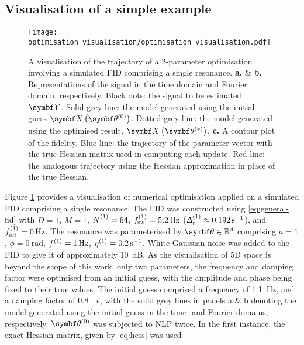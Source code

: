 \subsection{Visualisation of a simple example}
\label{subsec:optim-vis}
\begin{figure}
    \centering
    \texttt{[image: optimisation\_visualisation/optimisation\_visualisation.pdf]}
    \caption[
        A visualisation of the trajectory of a 2-parameter optimisation
        involving a simulated \acs{FID} comprising a single resonance.
    ]
    {
        A visualisation of the trajectory of a 2-parameter optimisation
        involving a simulated \acs{FID} comprising a single resonance.
        \textbf{a.} \& \textbf{b.} Representations of the signal in
        the time domain and Fourier domain, respectively.
        Black dots: the signal to be estimated $\bY$.
        Solid grey line: the model generated
        using the initial guess $\bX \left( \bthzero \right)$.
        Dotted grey line: the model generated using the optimised result, $\bX
        \left( \bthstar \right)$.
        \textbf{c.} A contour plot of the fidelity.
        Blue line: the trajectory of the parameter vector with the true
        Hessian matrix used in computing each update.
        Red line: the analogous trajectory using the Hessian approximation
        in place of the true Hessian.
    }
    \label{fig:optim-vis}
\end{figure}
Figure \ref{fig:optim-vis} provides a visualisation of numerical optimisation
applied on a simulated \ac{FID} comprising a single resonance.
The FID was constructed using \eqref{eq:general-fid} with $D=1$, $M=1$,
$\None = 64$, $f_{\mathrm{sw}}^{(1)} = \qty{5.2}{\hertz}$ ($\Updelta_t^{(1)} \approx
\qty{0.192}{\per\second}$), and $f_{\mathrm{off}}^{(1)} = \qty{0}{\hertz}$.
The resonance was parameterised by $\bth \in \mathbb{R}^4$ comprising $a=1$,
$\phi=\qty{0}{\radian}$, $f^{(1)}=\qty{1}{\hertz}$, $\eta^{(1)}=\qty{0.2}{\per\second}$.
White Gaussian noise was added to the FID to give it  of approximately
\qty{10}{\deci\bel}. As the visualisation of 5D space is beyond the scope of
this work, only two parameters, the frequency and damping factor were optimised
from an initial guess, with the amplitude and phase being fixed to their true
values. The initial guess comprised a frequency of \qty{1.1}{\hertz}, and a
damping factor of \qty{0.8}{\per\second}, with the solid grey lines in panels a
\& b denoting the model generated using the initial guess in the time- and
Fourier-domains, respectively. $\bthzero$ was subjected to \ac{NLP} twice. In
the first instance, the exact Hessian matrix, given by \eqref{eq:hess} was used
